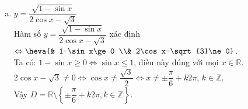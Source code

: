 \begin{ex}
{\begin{enumerate}[a)]
			\item $y=\dfrac{\sqrt{1-\sin x}}{2\cos x-\sqrt{3}}$\\
			      Hàm số $y=\dfrac{\sqrt{1-\sin x}}{2\cos x-\sqrt{3}}$ xác định $\Leftrightarrow \heva{& 1-\sin x\ge 0 \\& 2\cos x-\sqrt{3}\ne 0}$.\\
			      Ta có: $1-\sin x\ge 0\Leftrightarrow \sin x\le 1$, điều này đúng với mọi $x\in \mathbb{R}$.\\
			      $2\cos x-\sqrt{3}\ne 0\Leftrightarrow \cos x\ne \dfrac{\sqrt{3}}{2}\Leftrightarrow x\ne \pm \dfrac{\pi }{6}+k2\pi $, $k\in \mathbb{Z}$.\\
			      Vậy $D=\mathbb{R}\setminus \left\{ \pm \dfrac{\pi }{6}+k2\pi ,k\in \mathbb{Z} \right\}$.
		\end{enumerate}
	}
\end{ex}
